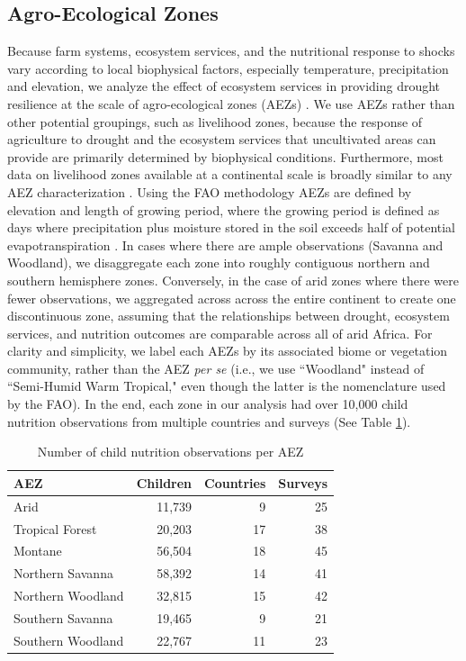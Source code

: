 \documentclass[titlepage]{article}
\begin{document}
\subsection{Agro-Ecological Zones}
Because farm systems, ecosystem services, and the nutritional response to shocks vary according to local biophysical factors, especially temperature, precipitation and elevation, we analyze the effect of ecosystem services in providing drought resilience at the scale of agro-ecological zones (AEZs) \citep{dimitrova2020monsoon}.  We use AEZs rather than other potential groupings, such as livelihood zones, because the response of agriculture to drought and the ecosystem services that uncultivated areas can provide are primarily determined by biophysical conditions.  Furthermore, most data on livelihood zones available at a continental scale is broadly similar to any AEZ characterization \citep{Lynam2002}.  Using the FAO methodology \citep{Fischer2006} AEZs are defined by elevation and length of growing period, where the growing period is defined as days where precipitation plus moisture stored in the soil exceeds half of potential evapotranspiration \citep{Fischer2006}.  In cases where there are ample observations (Savanna and Woodland), we disaggregate each zone into roughly contiguous northern and southern hemisphere zones.  Conversely, in the case of arid zones where there were fewer observations, we aggregated across across the entire continent to create one discontinuous zone, assuming that the relationships between drought, ecosystem services, and nutrition outcomes are comparable across all of arid Africa.  For clarity and simplicity, we label each AEZs by its associated biome or vegetation community, rather than the AEZ \textit{per se} (i.e., we use ``Woodland" instead of ``Semi-Humid Warm Tropical," even though the latter is the nomenclature used by the FAO).  In the end, each zone in our analysis had over 10,000 child nutrition observations from multiple countries and surveys (See Table \ref{table:AEZtab}).

\begin{table}[h]
	\begin{center}
	\begin{tabular}{l | r | r | r}
		AEZ & Children & Countries & Surveys \\
		\hline
		Arid & 11,739 & 9 & 25\\
		Tropical Forest & 20,203 & 17 & 38 \\
    Montane & 56,504 & 18 & 45 \\
		Northern Savanna & 58,392 & 14 & 41 \\
		Northern Woodland & 32,815 & 15 & 42 \\
		Southern Savanna & 19,465 & 9 & 21 \\
		Southern Woodland & 22,767 & 11 & 23 \\
	\end{tabular}
\caption{Number of child nutrition observations per AEZ}
\label{table:AEZtab}
\end{center}
\end{table}
\end{document}
